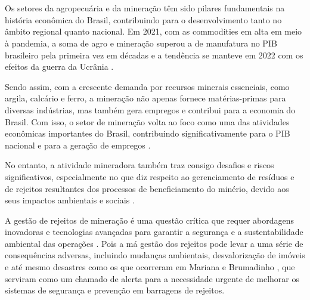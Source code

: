 \chapter*{}
\noindent
{}



\vspace{1.4cm}

Os setores da agropecuária e da mineração têm sido pilares fundamentais na história econômica do Brasil, contribuindo para o desenvolvimento tanto no âmbito regional quanto nacional. Em 2021, com as commodities em alta em meio à pandemia, a soma de agro e mineração superou a de manufatura no PIB brasileiro pela primeira vez em décadas e a tendência se manteve em 2022 com os efeitos da guerra da Ucrânia \cite{BBC2023}.

Sendo assim, com a crescente demanda por recursos minerais essenciais, como argila, calcário e ferro, a mineração não apenas fornece matérias-primas para diversas indústrias, mas também gera empregos e contribui para a economia do Brasil. Com isso, o setor de mineração volta ao foco como uma das atividades econômicas importantes do Brasil, contribuindo significativamente para o PIB nacional e para a geração de empregos \cite{IBRAM2020}.

No entanto, a atividade mineradora também traz consigo desafios e riscos significativos, especialmente no que diz respeito ao gerenciamento de resíduos e de rejeitos resultantes dos processos de beneficiamento do minério, devido aos seus impactos ambientais e sociais \cite{ipea2017boletim}.

A gestão de rejeitos de mineração é uma questão crítica que requer abordagens inovadoras e tecnologias avançadas para garantir a segurança e a sustentabilidade ambiental das operações \cite{EPA2019}. Pois a má gestão dos rejeitos pode levar a uma série de consequências adversas, incluindo mudanças ambientais, desvalorização de imóveis e até mesmo desastres como os que ocorreram em Mariana e Brumadinho \cite{ipea2017boletim}, que serviram como um chamado de alerta para a necessidade urgente de melhorar os sistemas de segurança e prevenção em barragens de rejeitos.

